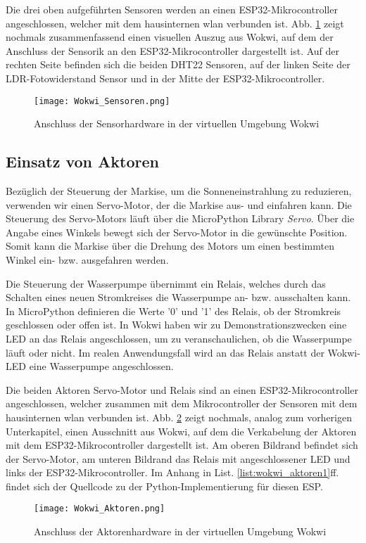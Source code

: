 Die drei oben aufgeführten Sensoren werden an einen ESP32-Mikrocontroller angeschlossen, welcher mit dem hausinternen \gls{wlan} verbunden ist. Abb. \ref{fig:wokwi_sensoren} zeigt nochmals zusammenfassend einen visuellen Auszug aus Wokwi, auf dem der Anschluss der Sensorik an den ESP32-Mikrocontroller dargestellt ist. Auf der rechten Seite befinden sich die beiden DHT22 Sensoren, auf der linken Seite der LDR-Fotowiderstand Sensor und in der Mitte der ESP32-Mikrocontroller.

\begin{figure}[h]
    \centering
    \texttt{[image: Wokwi\_Sensoren.png]}
    \caption{Anschluss der Sensorhardware in der virtuellen Umgebung Wokwi}\label{fig:wokwi_sensoren}
\end{figure}

\subsection{Einsatz von Aktoren}
Bezüglich der Steuerung der Markise, um die Sonneneinstrahlung zu reduzieren, verwenden wir einen Servo-Motor, der die Markise aus- und einfahren kann. Die Steuerung des Servo-Motors läuft über die MicroPython Library \textit{Servo}. Über die Angabe eines Winkels bewegt sich der Servo-Motor in die gewünschte Position. Somit kann die Markise über die Drehung des Motors um einen bestimmten Winkel ein- bzw. ausgefahren werden.

Die Steuerung der Wasserpumpe übernimmt ein Relais, welches durch das Schalten eines neuen Stromkreises die Wasserpumpe an- bzw. ausschalten kann. In MicroPython definieren die Werte '0' und '1' des Relais, ob der Stromkreis geschlossen oder offen ist. In Wokwi haben wir zu Demonstrationszwecken eine LED an das Relais angeschlossen, um zu veranschaulichen, ob die Wasserpumpe läuft oder nicht. Im realen Anwendungsfall wird an das Relais anstatt der Wokwi-LED eine Wasserpumpe angeschlossen.

Die beiden Aktoren Servo-Motor und Relais sind an einen ESP32-Mikrocontroller angeschlossen, welcher zusammen mit dem Mikrocontroller der Sensoren mit dem hausinternen \gls{wlan} verbunden ist. Abb. \ref{fig:wokwi_aktoren} zeigt nochmals, analog zum vorherigen Unterkapitel, einen Ausschnitt aus Wokwi, auf dem die Verkabelung der Aktoren mit dem ESP32-Mikrocontroller dargestellt ist. Am oberen Bildrand befindet sich der Servo-Motor, am unteren Bildrand das Relais mit angeschlossener LED und links der ESP32-Mikrocontroller. Im Anhang in List. \ref{list:wokwi_aktoren1}ff. findet sich der Quellcode zu der Python-Implementierung für diesen ESP.

\begin{figure}[h]
    \centering
    \texttt{[image: Wokwi\_Aktoren.png]}
    \caption{Anschluss der Aktorenhardware in der virtuellen Umgebung Wokwi}\label{fig:wokwi_aktoren}
\end{figure}